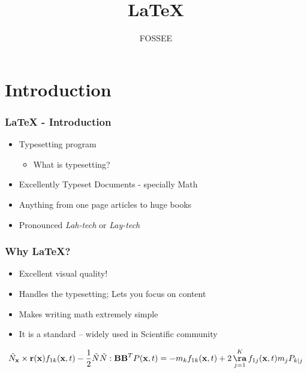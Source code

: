 \documentclass{beamer}
\title{\LaTeX}
\author[FOSSEE] {FOSSEE}
\institute[IIT Bombay] {Department of Aerospace Engineering\\IIT
  Bombay}
\date{}
\begin{document}
\begin{frame}
  \maketitle  
\end{frame}

\section{Introduction}

\begin{frame}
  \frametitle{{\LaTeX} - Introduction}
  \begin{itemize}
  \item Typesetting program
    \begin{itemize}
    \item What is typesetting?
    \end{itemize}
  \item Excellently Typeset Documents - specially Math
  \item Anything from one page articles to huge books
  \item Pronounced \emph{Lah-tech} or \emph{Lay-tech}
  \end{itemize}
\end{frame}

\begin{frame}
  \frametitle{Why \LaTeX?}
  \begin{itemize}
  \item Excellent visual quality! 
  \item Handles the typesetting; Lets you focus on content
  \item Makes writing math extremely simple
  \item It is a standard -- widely used in Scientific community
  \end{itemize}
  \begin{block}{}
    \[\tilde{N}_{\mathbf{x}}\times \mathbf{r}(\mathbf{x}) f_{1k}(\mathbf{x},t) - \frac{1}{2} \tilde{N} \tilde{N}:\mathbf{BB}^{T}P(\mathbf{x},t) = -m_{k}f_{1k}(\mathbf{x},t) + 2 \mathop{\mathbf{\aa}}_{j=1}^{K} f_{1j}(\mathbf{x},t)m_{j}P_{k|j} \]
  \end{block}
\end{frame}
\end{document}
